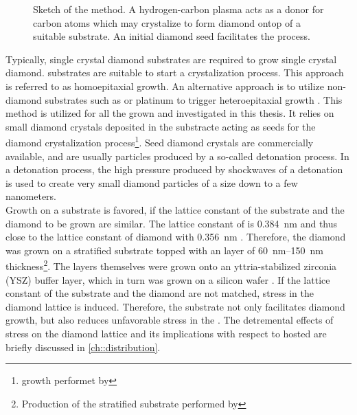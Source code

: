 	\begin{figure}[htp]
		\centering
		\caption[\CVD production method]{Sketch of the \CVD method. A hydrogen-carbon plasma acts as a donor for carbon atoms which may crystalize to form diamond ontop of a suitable \ir substrate. An initial diamond seed facilitates the process.}
		\label{fig::cvd_sketch}
	\end{figure}

	Typically, single crystal diamond substrates are required to grow single crystal diamond. \HPHT substrates are suitable to start a crystalization process. This approach is referred to as homoepitaxial growth. An alternative approach is to utilize non-diamond substrates such as \ir or platinum to trigger heteroepitaxial growth \cite{janine::142, neu::143}.
	This method is utilized for all the \CVD \nds grown and investigated in this thesis.
	It relies on small diamond crystals deposited in the substracte acting as seeds for the diamond crystalization process\footnote{\CVD \nd growth performet by \gsell}. Seed diamond crystals are commercially available, and are usually particles produced by a so-called detonation process.
	In a detonation process, the high pressure produced by shockwaves of a detonation is used to create very small diamond particles of a size down to a few nanometers.
	\\
	Growth on a substrate is favored, if the lattice constant of the substrate and the diamond to be grown are similar.
	The lattice constant of \ir is \SI{0.384}{nm} \cite{Arblaster2010,Gsell2007} and thus close to the lattice constant of diamond with \SI{0.356}{nm} \cite{Davis1993}.
	Therefore, the diamond was grown on a stratified substrate topped with an \ir layer of \SIrange{60}{150}{nm} thickness\footnote{Production of the stratified substrate performed by \gsell}. 
	The \ir layers themselves were grown onto an yttria-stabilized zirconia (YSZ) buffer layer, which in turn was grown on a silicon wafer \cite{Gsell2004a}.
	If the lattice constant of the substrate and the diamond are not matched, stress in the diamond lattice is induced.
	Therefore, the \ir substrate not only facilitates diamond growth, but also reduces unfavorable stress in the \nds. The detremental effects of stress on the diamond lattice and its implications with respect to hosted \sivs are briefly discussed in \autoref{ch::distribution}.
